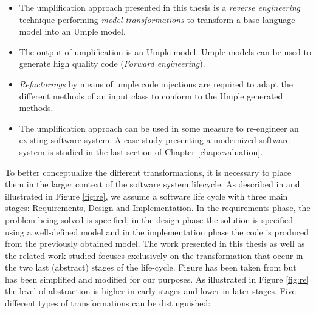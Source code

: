 \begin{itemize}
\item The umplification approach presented in this thesis is a \textit{reverse engineering} technique performing \textit{model transformations} to transform a base language model into an Umple model. 
\item The output of umplification is an Umple model. Umple models can be used to generate high quality code (\textit{Forward engineering}).
\item \textit{Refactorings} by means of umple code injections are required to adapt the different methods of an input class to conform to the Umple generated methods.
\item The umplification approach can be used in some measure to re-engineer an existing software system. A case study presenting a modernized software system is studied in the last section of Chapter \ref{chap:evaluation}.
\end{itemize}

To better conceptualize the different transformations, it is necessary to place them in the larger context of the software system lifecycle. As described in \cite{Chikofsky} and illustrated in Figure \ref{fig:re}, we assume a software life cycle with three main stages: Requirements, Design and Implementation. In the requirements phase, the problem being solved is specified, in the design phase the solution is specified using a well-defined model and in the implementation phase the code is produced from the previously obtained model. The work presented in this thesis as well as the related work studied focuses exclusively on the transformation that occur in the two last (abstract) stages of the life-cycle. Figure has been taken from \cite{Chikofsky} but has been simplified and modified for our purposes. As illustrated in Figure \ref{fig:re} the level of abstraction is higher in early stages and lower in later stages. Five different types of transformations can be distinguished:

